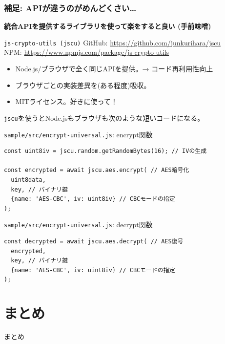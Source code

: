 \documentclass[12pt,dvipdfmx]{beamer}
\begin{document}
\begin{frame}
\frametitle{補足: APIが違うのがめんどくさい…}
\small 
\textbf{統合APIを提供するライブラリを使って楽をすると良い (手前味噌)}

\begin{block}{\texttt{js-crypto-utils (jscu)}}
GitHub: \url{https://github.com/junkurihara/jscu}\\
NPM: \url{https://www.npmjs.com/package/js-crypto-utils}
\end{block}

\begin{itemize}
\item Node.js/ブラウザで全く同じAPIを提供。→ コード再利用性向上
\item ブラウザごとの実装差異を(ある程度)吸収。
\item MITライセンス。好きに使って！
\end{itemize}
\end{frame}

\begin{frame}[fragile]
\texttt{jscu}を使うとNode.jsもブラウザも次のような短いコードになる。

\begin{block}{\small \texttt{sample/src/encrypt-universal.js}: encrypt関数}
\scriptsize
\begin{verbatim}
const uint8iv = jscu.random.getRandomBytes(16); // IVの生成

const encrypted = await jscu.aes.encrypt( // AES暗号化
  uint8data,
  key, // バイナリ鍵
  {name: 'AES-CBC', iv: uint8iv} // CBCモードの指定
);
\end{verbatim}
\end{block}


\begin{block}{\small \texttt{sample/src/encrypt-universal.js}: decrypt関数}
\scriptsize
\begin{verbatim}
const decrypted = await jscu.aes.decrypt( // AES復号
  encrypted,
  key, // バイナリ鍵
  {name: 'AES-CBC', iv: uint8iv} // CBCモードの指定
);
\end{verbatim}
\end{block}

\end{frame}

\section{まとめ}
\begin{frame}
 \centering
 {\Large まとめ}
\end{frame}
\end{document}
